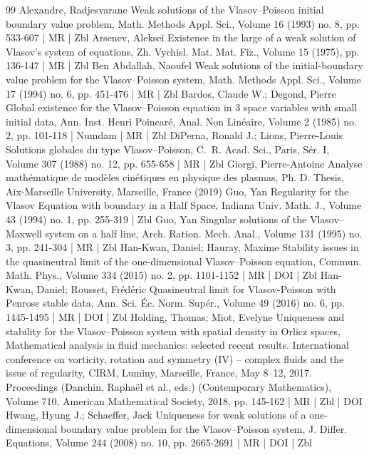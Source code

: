 \begin{thebibliography}{99}
Alexandre, Radjesvarane Weak solutions of the Vlasov–Poisson initial boundary value problem, Math. Methods Appl. Sci., Volume 16 (1993) no. 8, pp. 533-607 | MR | Zbl
Arsenev, Alekseĭ Existence in the large of a weak solution of Vlasov’s system of equations, Zh. Vychisl. Mat. Mat. Fiz., Volume 15 (1975), pp. 136-147 | MR | Zbl
Ben Abdallah, Naoufel Weak solutions of the initial-boundary value problem for the Vlasov–Poisson system, Math. Methods Appl. Sci., Volume 17 (1994) no. 6, pp. 451-476 | MR | Zbl
Bardos, Claude W.; Degond, Pierre Global existence for the Vlasov–Poisson equation in 3 space variables with small initial data, Ann. Inst. Henri Poincaré, Anal. Non Linéaire, Volume 2 (1985) no. 2, pp. 101-118 | Numdam | MR | Zbl
DiPerna, Ronald J.; Lions, Pierre-Louis Solutions globales du type Vlasov–Poisson, C. R. Acad. Sci., Paris, Sér. I, Volume 307 (1988) no. 12, pp. 655-658 | MR | Zbl
Giorgi, Pierre-Antoine Analyse mathématique de modèles cinétiques en physique des plasmas, Ph. D. Thesis, Aix-Marseille University, Marseille, France (2019)
Guo, Yan Regularity for the Vlasov Equation with boundary in a Half Space, Indiana Univ. Math. J., Volume 43 (1994) no. 1, pp. 255-319 | Zbl
Guo, Yan Singular solutions of the Vlasov–Maxwell system on a half line, Arch. Ration. Mech. Anal., Volume 131 (1995) no. 3, pp. 241-304 | MR | Zbl
Han-Kwan, Daniel; Hauray, Maxime Stability issues in the quasineutral limit of the one-dimensional Vlasov–Poisson equation, Commun. Math. Phys., Volume 334 (2015) no. 2, pp. 1101-1152 | MR | DOI | Zbl
Han-Kwan, Daniel; Rousset, Frédéric Quasineutral limit for Vlasov-Poisson with Penrose stable data, Ann. Sci. Éc. Norm. Supér., Volume 49 (2016) no. 6, pp. 1445-1495 | MR | DOI | Zbl
Holding, Thomas; Miot, Evelyne Uniqueness and stability for the Vlasov–Poisson system with spatial density in Orlicz spaces, Mathematical analysis in fluid mechanics: selected recent results. International conference on vorticity, rotation and symmetry (IV) – complex fluids and the issue of regularity, CIRM, Luminy, Marseille, France, May 8–12, 2017. Proceedings (Danchin, Raphaël et al., eds.) (Contemporary Mathematics), Volume 710, American Mathematical Society, 2018, pp. 145-162 | MR | Zbl | DOI
Hwang, Hyung J.; Schaeffer, Jack Uniqueness for weak solutions of a one-dimensional boundary value problem for the Vlasov–Poisson system, J. Differ. Equations, Volume 244 (2008) no. 10, pp. 2665-2691 | MR | DOI | Zbl

\end{thebibliography}

